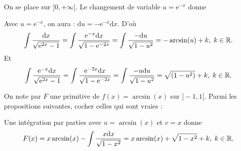 \begin{question}
On se place sur $]0,+\infty[$. Le changement de variable $u=\mathrm{e}^{-x}$ donne
\begin{answers}  
\end{answers}
\vskip2mm
\begin{explanations}
Avec $u=\mathrm{e}^{-x}$, on aura : $\mathrm{d}u=-\mathrm{e}^{-x}\mathrm{d}x$. D'où
$$\displaystyle \int \frac{\mathrm{d}x}{\sqrt{\mathrm{e}^{2x}-1}}=\int \frac{\mathrm{e}^{-x}\mathrm{d}x}{\sqrt{1-\mathrm{e}^{-2x}}}=\int \frac{-\mathrm{d}u}{\sqrt{1-u^2}}=-\arcsin(u)+k,\; k\in \mathbb{R}.$$
Et
$$\displaystyle \int \frac{\mathrm{e}^{-x}\mathrm{d}x}{\sqrt{\mathrm{e}^{2x}-1}}=\int \frac{\mathrm{e}^{-2x}\mathrm{d}x}{\sqrt{1-\mathrm{e}^{-2x}}}=\int \frac{-u\mathrm{d}u}{\sqrt{1-u^2}}=\sqrt{(1-u^2)}+k,\; k\in \mathbb{R}.$$
\end{explanations}
\end{question}

\begin{question}
On note par $F$ une primitive de $f(x)=\arcsin (x)$ sur $]-1,1[$. Parmi les propositions suivantes, cocher celles qui sont vraies :
\begin{answers}  
\end{answers}
\begin{explanations}
Une intégration par parties avec $u=\arcsin (x)$ et $v=x$ donne
$$F(x)=x\arcsin (x)-\int \frac{x\mathrm{d}x}{\sqrt{1-x^2}}=x\arcsin (x)+\sqrt{1-x^2}+k,\; k\in \mathbb{R}.$$
\end{explanations}
\end{question}

